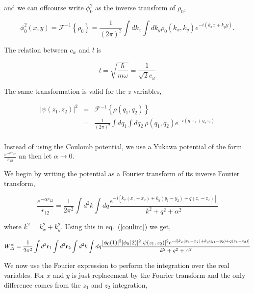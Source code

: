 \documentclass[a4paper,10pt]{article}
\begin{document}
\noindent and we can offcourse write $\phi^2_0$ as the inverse transform of $\rho_0$,

\begin{equation}
\phi_0^2(x,y) = \mathcal{F}^{-1}\left\lbrace\rho_0\right\rbrace =\frac{1}{(2\pi)^2} \int dk_x \int dk_y \rho_0(k_x,k_y) e^{-i(k_x x + k_y y )}.
\end{equation}

The relation between $c_w$ and $l$ is

\begin{equation}
l=\sqrt{\frac{\hbar}{m \omega}}=\frac{1}{\sqrt{2}c_\omega}
\end{equation}

The same transformation is valid for the $z$ variables,

\begin{eqnarray}
|\psi(z_1,z_2)|^2 &=& \mathcal{F}^{-1}\left\lbrace\rho(q_1,q_2)\right\rbrace \\
&=& \frac{1}{(2\pi)^2} \int dq_1 \int dq_2\ \rho(q_1,q_2) e^{-i(q_1 z_1 + q_2 z_2 )} \\
\end{eqnarray}

Instead of using the Coulomb potential, we use a Yukawa potential of the form
$\frac{e^{-\alpha r_{12}}}{r_{12}}$ an then let $\alpha \rightarrow 0$.

We begin by writing the potential as a Fourier transform of its inverse Fourier transform,

\begin{equation}
\frac{e^{-\alpha r_{12}}}{r_{12}} = \frac{1}{2\pi^2} \int d^2k \int dq \frac{e^{-i\left[k_x(x_1-x_2) + k_y(y_1-y_2) + q (z_1-z_2)\right]}}{k^2 + q^2 + \alpha^2}
\end{equation}

\noindent where $k^{2}=k^{2}_{x} + k^{2}_{y}$. Using this in eq.~(\ref{coulint}) we get,

\begin{equation}
W^{\alpha}_{12}= \frac{1}{2\pi^2}\int d^3\mathbf{r}_1 \int d^3\mathbf{r}_2 \int d^2k \int dq \frac{
|\phi_0(1)|^2|\phi_0(2)|^2|\psi(z_1,z_2)|^2 e^{-i\left[k_x(x_1-x_2) +
k_y(y_1-y_2) + q (z_1-z_2)\right]}}{k^2 + q^2 + \alpha^2}
\end{equation}

We now use the Fourier expression to perform the integration over the real variables. For
$x$ and $y$ is just replacement by the Fourier transform and the
only difference comes from the $z_1$ and $z_2$ integration,
\end{document}
